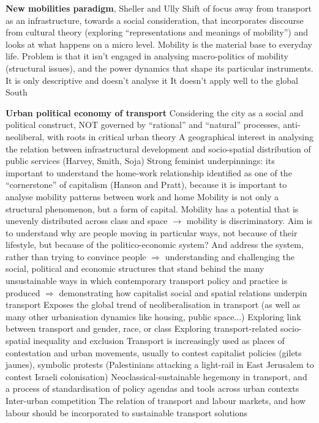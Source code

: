 \documentclass{article}
\begin{document}
\begin{outline}
	\1 \textbf{New mobilities paradigm}, Sheller and Ully
		\2 Shift of focus away from transport as an infrastructure, towards a social consideration, that incorporates discourse from cultural theory (exploring ``representations and meanings of mobility'') and looks at what happens on a micro level. Mobility is the material base to everyday life. 
		\2 Problem is that it isn't engaged in analysing macro-politics of mobility (structural issues), and the power dynamics that shape its particular instruments. It is only descriptive and doesn't analyse it
		\2 It doesn't apply well to the global South
		
	\1 \textbf{Urban political economy of transport}
		\2 Considering the city as a social and political construct, NOT governed by ``rational'' and ``natural'' processes, anti-neoliberal, with roots in critical urban theory
		\2 A geographical interest in analysing the relation between infrastructural development and socio-spatial distribution of public services (Harvey, Smith, Soja)
		\2 Strong feminist underpinnings: its important to understand the home-work relationship identified as one of the ``cornerstone'' of capitalism (Hanson and Pratt), because it is important to analyse mobility patterns between work and home
		\2 Mobility is not only a structural phenomenon, but a form of capital. Mobility has a potential that is unevenly distributed across class and space $\rightarrow$ mobility is discriminatory. Aim is to understand why are people moving in particular ways, not because of their lifestyle, but because of the politico-economic system? And address the system, rather than trying to convince people
		\2 $\Rightarrow$ understanding and challenging the social, political and economic structures that stand behind the many unsustainable ways in which contemporary transport policy and practice is produced 
		\2 $\Rightarrow$ demonstrating how capitalist social and spatial relations underpin transport
	\1 Exposes the global trend of neoliberalisation in transport (as well as many other urbanisation dynamics like housing, public space...)
	\1 Exploring link between transport and gender, race, or class
	\1 Exploring transport-related socio-spatial inequality and exclusion
	\1 Transport is increasingly used as places of contestation and urban movements, usually to contest capitalist policies (gilets jaunes), symbolic protests (Palestinians attacking a light-rail in East Jerusalem to contest Israeli colonisation)
	\1 Neoclassical-sustainable hegemony in transport, and a process of standardisation of policy agendas and tools across urban contexts
	\1 Inter-urban competition
	\1 The relation of transport and labour markets, and how labour should be incorporated to sustainable transport solutions
\end{outline}
\end{document}
